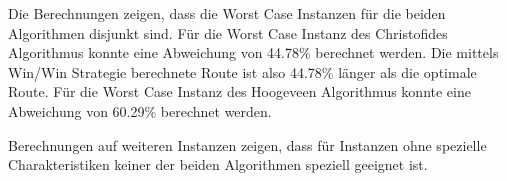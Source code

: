\documentclass[11pt,a4paper]{article}
\begin{document}
Die Berechnungen zeigen, dass die Worst Case Instanzen für die beiden Algorithmen disjunkt sind. Für die Worst Case Instanz des Christofides Algorithmus konnte eine Abweichung von 44.78\% berechnet werden. Die mittels Win/Win Strategie berechnete Route ist also 44.78\% länger als die optimale Route. Für die Worst Case Instanz des Hoogeveen Algorithmus konnte eine Abweichung von 60.29\% berechnet werden.

Berechnungen auf weiteren Instanzen zeigen, dass für Instanzen ohne spezielle Charakteristiken keiner der beiden Algorithmen speziell geeignet ist.
\end{document}
